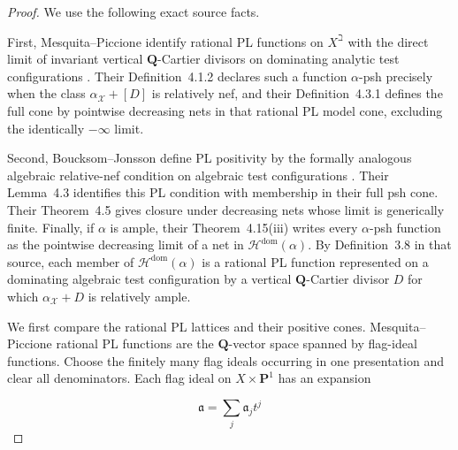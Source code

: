 
\begin{proof}
We use the following exact source facts.

First, Mesquita--Piccione identify rational PL functions on \(X^\beth\)
with the direct limit of invariant vertical \(\mathbf Q\)-Cartier divisors
on dominating analytic test configurations
\cite[Proposition~2.4.3 and Theorem~2.6.4]{MP24}.  Their
Definition~4.1.2 declares such a
function \(\alpha\)-psh precisely when the class
\(\alpha_{\mathcal X}+[D]\) is relatively nef, and their
Definition~4.3.1 defines the full cone by pointwise decreasing nets in
that rational PL model cone, excluding the identically
\(-\infty\) limit.

Second, Boucksom--Jonsson define PL positivity by the formally analogous
algebraic relative-nef condition on algebraic test configurations
\cite[Definition~3.2]{BJ22}.  Their Lemma~4.3 identifies this PL
condition with membership in their full psh cone.  Their Theorem~4.5
gives closure under decreasing nets whose limit is generically finite.
Finally, if \(\alpha\) is ample, their Theorem~4.15(iii) writes every
\(\alpha\)-psh function as the pointwise decreasing limit of a net in
\(\mathcal H^{\mathrm{dom}}(\alpha)\).  By Definition~3.8 in that source,
each member of \(\mathcal H^{\mathrm{dom}}(\alpha)\) is a rational PL
function represented on a dominating algebraic test configuration by a
vertical \(\mathbf Q\)-Cartier divisor \(D\) for which
\(\alpha_{\mathcal X}+D\) is relatively ample.

We first compare the rational PL lattices and their positive cones.
Mesquita--Piccione rational PL functions are the
\(\mathbf Q\)-vector space spanned by flag-ideal functions.  Choose the
finitely many flag ideals occurring in one presentation and clear all
denominators.  Each flag ideal on \(X\times\mathbf P^1\) has an expansion

\[
                    \mathfrak a=\sum_j\mathfrak a_jt^j
\]


\end{proof}
